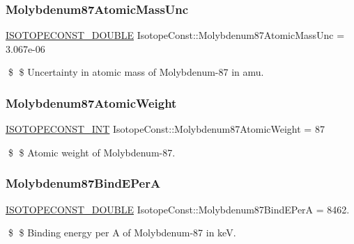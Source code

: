 \subsubsection{\texorpdfstring{Molybdenum87\+Atomic\+Mass\+Unc}{Molybdenum87AtomicMassUnc}}
{\footnotesize\ttfamily \mbox{\hyperlink{group___isotope_const-_macros_ga8f45a7272ce02c0b4c65c44636ed719a}{I\+S\+O\+T\+O\+P\+E\+C\+O\+N\+S\+T\+\_\+\+D\+O\+U\+B\+LE}} Isotope\+Const\+::\+Molybdenum87\+Atomic\+Mass\+Unc = 3.\+067e-\/06}

\$ \$ Uncertainty in atomic mass of Molybdenum-\/87 in amu. \mbox{\label{group___isotope_const-_molybdenum-_mo87_gae93d1f7d143a918439661e9379c52f93}} 
\subsubsection{\texorpdfstring{Molybdenum87\+Atomic\+Weight}{Molybdenum87AtomicWeight}}
{\footnotesize\ttfamily \mbox{\hyperlink{group___isotope_const-_macros_ga5f18360b3e99483a35c32d789e62621c}{I\+S\+O\+T\+O\+P\+E\+C\+O\+N\+S\+T\+\_\+\+I\+NT}} Isotope\+Const\+::\+Molybdenum87\+Atomic\+Weight = 87}

\$ \$ Atomic weight of Molybdenum-\/87. \mbox{\label{group___isotope_const-_molybdenum-_mo87_ga891566d93e7a9a3fb8e04b32910eb7f8}} 
\subsubsection{\texorpdfstring{Molybdenum87\+Bind\+E\+PerA}{Molybdenum87BindEPerA}}
{\footnotesize\ttfamily \mbox{\hyperlink{group___isotope_const-_macros_ga8f45a7272ce02c0b4c65c44636ed719a}{I\+S\+O\+T\+O\+P\+E\+C\+O\+N\+S\+T\+\_\+\+D\+O\+U\+B\+LE}} Isotope\+Const\+::\+Molybdenum87\+Bind\+E\+PerA = 8462.}

\$ \$ Binding energy per A of Molybdenum-\/87 in keV. \mbox{\label{group___isotope_const-_molybdenum-_mo87_ga7c415113d1b145439b8e7f79fe0acd4d}} 
